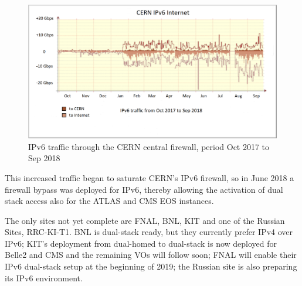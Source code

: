  \begin{figure}[h!]
\includegraphics[width=13cm]{figure1-revised.png}
\caption{IPv6 traffic through the CERN central firewall, period Oct 2017 to Sep 2018}
\label{fig:tier0-traffic}
\end{figure}
 
This increased traffic began to saturate CERN's IPv6 firewall, so in June 2018 a
firewall bypass was deployed for IPv6,
thereby allowing the activation of dual stack access also for the ATLAS and CMS EOS instances.    
 


The only sites not yet complete are FNAL, BNL, KIT and one of the Russian Sites, RRC-KI-T1. 
BNL is dual-stack ready, but they currently prefer IPv4 over IPv6; KIT's deployment from dual-homed to dual-stack is now deployed for Belle2 and CMS and the remaining VOs will follow soon; 
FNAL will enable their IPv6 dual-stack setup at the beginning of 2019; the Russian site is also preparing its IPv6 environment.

